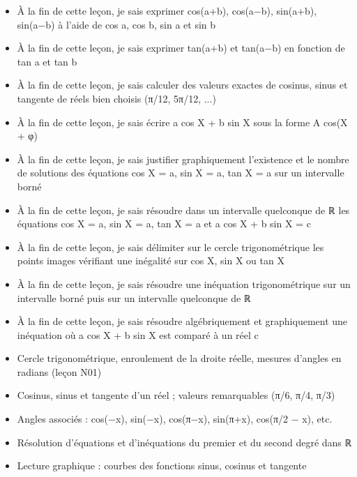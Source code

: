 \documentclass[11pt]{article}
\begin{document}
\begin{objectifs}
\begin{itemize}
\item À la fin de cette leçon, je sais exprimer cos(a+b), cos(a−b), sin(a+b), sin(a−b) à l'aide de cos a, cos b, sin a et sin b
\item À la fin de cette leçon, je sais exprimer tan(a+b) et tan(a−b) en fonction de tan a et tan b
\item À la fin de cette leçon, je sais calculer des valeurs exactes de cosinus, sinus et tangente de réels bien choisis (π/12, 5π/12, ...)
\item À la fin de cette leçon, je sais écrire a cos X + b sin X sous la forme A cos(X + φ)
\item À la fin de cette leçon, je sais justifier graphiquement l'existence et le nombre de solutions des équations cos X = a, sin X = a, tan X = a sur un intervalle borné
\item À la fin de cette leçon, je sais résoudre dans un intervalle quelconque de ℝ les équations cos X = a, sin X = a, tan X = a et a cos X + b sin X = c
\item À la fin de cette leçon, je sais délimiter sur le cercle trigonométrique les points images vérifiant une inégalité sur cos X, sin X ou tan X
\item À la fin de cette leçon, je sais résoudre une inéquation trigonométrique sur un intervalle borné puis sur un intervalle quelconque de ℝ
\item À la fin de cette leçon, je sais résoudre algébriquement et graphiquement une inéquation où a cos X + b sin X est comparé à un réel c
\end{itemize}
\end{objectifs}

\begin{prerequis}
\begin{itemize}
\item Cercle trigonométrique, enroulement de la droite réelle, mesures d'angles en radians (leçon N01)
\item Cosinus, sinus et tangente d'un réel ; valeurs remarquables (π/6, π/4, π/3)
\item Angles associés : cos(−x), sin(−x), cos(π−x), sin(π+x), cos(π/2 − x), etc.
\item Résolution d'équations et d'inéquations du premier et du second degré dans ℝ
\item Lecture graphique : courbes des fonctions sinus, cosinus et tangente
\end{itemize}
\end{prerequis}
\end{document}
